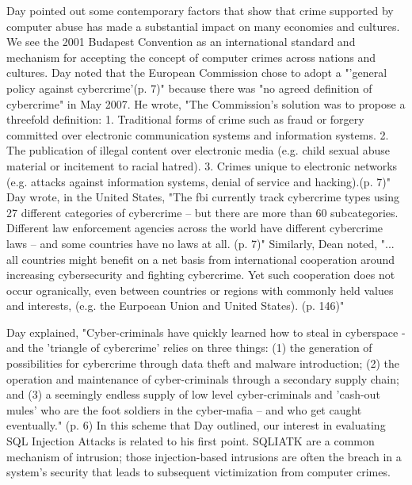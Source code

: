 Day pointed out some contemporary factors that show that crime supported by computer abuse has made a substantial impact on many economies and cultures.  We see the 2001 Budapest Convention as an international standard and mechanism for accepting the concept of computer crimes across nations and cultures.  Day noted that the European Commission chose to adopt a "'general policy against \gls{cybercrime}'(p. 7)" because there was "no agreed definition of \gls{cybercrime}" in May 2007.  He wrote, "The Commission's solution was to propose a threefold definition:  1. Traditional forms of crime such as fraud or forgery committed over electronic communication systems and information systems.  2.  The publication of illegal content over electronic media (e.g. child sexual abuse material or incitement to racial hatred).  3.  Crimes unique to electronic networks (e.g. attacks against information systems, denial of service and hacking).(p. 7)"  Day wrote, in the United States, "The \gls{fbi} currently track \gls{cybercrime} types using 27 different categories of \gls{cybercrime} -- but there are more than 60 subcategories.  Different law enforcement agencies across the world have different \gls{cybercrime} laws -- and some countries have no laws at all. (p. 7)"   Similarly, Dean noted, "... all countries might benefit on a net basis from international cooperation around increasing cybersecurity and fighting \gls{cybercrime}. Yet such cooperation does not occur ogranically, even between countries or regions with commonly held values and interests, (e.g. the Eurpoean Union and United States). (p. 146)"

Day explained, "Cyber-criminals have quickly learned how to steal in cyberspace - and the 'triangle of \gls{cybercrime}' relies on three things: (1) the generation of possibilities for \gls{cybercrime} through data theft and \gls{malware} introduction; (2) the operation and maintenance of cyber-criminals through a secondary supply chain; and (3) a seemingly endless supply of low level cyber-criminals and 'cash-out mules' who are the foot soldiers in the cyber-mafia -- and who get caught eventually."  (p. 6) In this scheme that Day outlined, our interest in evaluating SQL Injection Attacks is related to his first point.  SQLIATK are a common mechanism of intrusion; those injection-based intrusions are often the breach in a system's security that leads to subsequent victimization from computer crimes.

